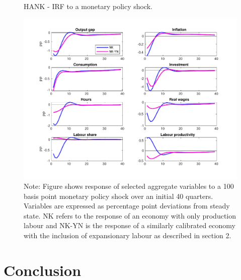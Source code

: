 \documentclass[12pt]{article}
\begin{document}
\begin{figure}
\centering
\caption{\label{fig:IRF_HANK} HANK - IRF to a monetary policy shock.}
\includegraphics[width=14cm]{IRF_HANK.pdf}
\caption*{\RaggedRight \footnotesize Note: Figure shows response of selected aggregate variables to a 100 basis point monetary policy shock over an initial 40 quarters. Variables are expressed as percentage point deviations from steady state. NK refers to the response of an economy with only production labour and NK-YN is the response of a similarly calibrated economy with the inclusion of expansionary labour as described in section 2.}
\end{figure}


\section{Conclusion}



\newpage

\end{document}
